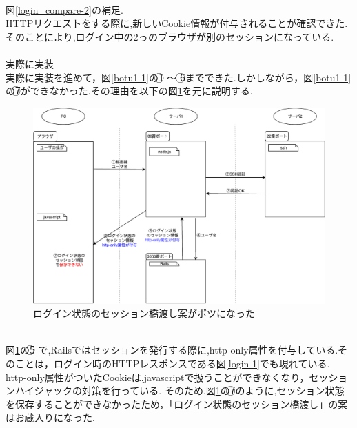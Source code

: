\\
図\ref{login_compare-2}の補足.\\
HTTPリクエストをする際に,新しいCookie情報が付与されることが確認できた.そのことにより,ログイン中の2っのブラウザが別のセッションになっている.
\\\\
\noindent 実際に実装\\
実際に実装を進めて，図\ref{botu1-1}の\textcircled{\scriptsize 1} 〜 \textcircled{\scriptsize 6}までできた.しかしながら，図\ref{botu1-1}の\textcircled{\scriptsize 7}ができなかった.その理由を以下の図\ref{botu1-2.pdf}を元に説明する.
\begin{figure}[h]
    \includegraphics[width=13cm]{fig/chapter3/botu1-2.pdf}
    \caption{ログイン状態のセッション橋渡し案がボツになった} 
    \label{botu1-2.pdf}
\end{figure}
\\
図\ref{botu1-2.pdf}の\textcircled{\scriptsize 5} で,Railsではセッションを発行する際に,http-only属性を付与している\cite{cookie-httponly-default}.そのことは，ログイン時のHTTPレスポンスである図\ref{login-1}でも現れている.
http-only属性がついたCookieは,javascriptで扱うことができなくなり，セッションハイジャックの対策を行っている\cite{cookie-httponly-security}.
そのため,図\ref{botu1-2.pdf}の\textcircled{\scriptsize 7}のように,セッション状態を保存することができなかったため，「ログイン状態のセッション橋渡し」の案はお蔵入りになった.
%
%
